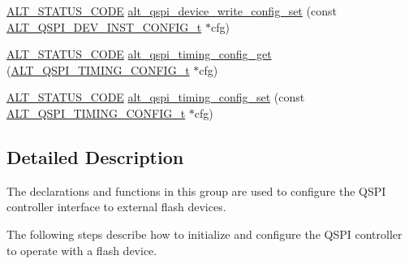 \begin{DoxyCompactItemize}
\item 
\mbox{\hyperlink{hwlib_8h_abdb0d369f069723ca55d6c94bcaaaa12}{A\+L\+T\+\_\+\+S\+T\+A\+T\+U\+S\+\_\+\+C\+O\+DE}} \mbox{\hyperlink{group__ALT__QSPI__DEV__CFG_gafc72bb52ae38dbe7a9260c730d96428a}{alt\+\_\+qspi\+\_\+device\+\_\+write\+\_\+config\+\_\+set}} (const \mbox{\hyperlink{group__ALT__QSPI__DEV__CFG_ga56516b11d66633580f54d1cc69c7aa8e}{A\+L\+T\+\_\+\+Q\+S\+P\+I\+\_\+\+D\+E\+V\+\_\+\+I\+N\+S\+T\+\_\+\+C\+O\+N\+F\+I\+G\+\_\+t}} $\ast$cfg)
\item 
\mbox{\hyperlink{hwlib_8h_abdb0d369f069723ca55d6c94bcaaaa12}{A\+L\+T\+\_\+\+S\+T\+A\+T\+U\+S\+\_\+\+C\+O\+DE}} \mbox{\hyperlink{group__ALT__QSPI__DEV__CFG_ga5f89298f2ed75c53da574d53cfbd747a}{alt\+\_\+qspi\+\_\+timing\+\_\+config\+\_\+get}} (\mbox{\hyperlink{group__ALT__QSPI__DEV__CFG_ga81b5f892a981d0ecb8fb454b3a1e1230}{A\+L\+T\+\_\+\+Q\+S\+P\+I\+\_\+\+T\+I\+M\+I\+N\+G\+\_\+\+C\+O\+N\+F\+I\+G\+\_\+t}} $\ast$cfg)
\item 
\mbox{\hyperlink{hwlib_8h_abdb0d369f069723ca55d6c94bcaaaa12}{A\+L\+T\+\_\+\+S\+T\+A\+T\+U\+S\+\_\+\+C\+O\+DE}} \mbox{\hyperlink{group__ALT__QSPI__DEV__CFG_ga1d0afe5312fe0294ef67f6525c52cf1e}{alt\+\_\+qspi\+\_\+timing\+\_\+config\+\_\+set}} (const \mbox{\hyperlink{group__ALT__QSPI__DEV__CFG_ga81b5f892a981d0ecb8fb454b3a1e1230}{A\+L\+T\+\_\+\+Q\+S\+P\+I\+\_\+\+T\+I\+M\+I\+N\+G\+\_\+\+C\+O\+N\+F\+I\+G\+\_\+t}} $\ast$cfg)
\end{DoxyCompactItemize}


\subsection{Detailed Description}
The declarations and functions in this group are used to configure the Q\+S\+PI controller interface to external flash devices.

The following steps describe how to initialize and configure the Q\+S\+PI controller to operate with a flash device.


